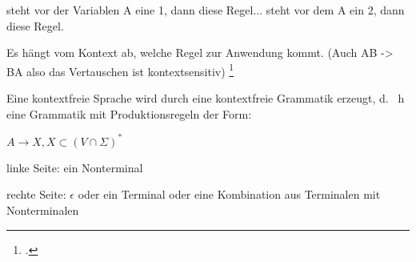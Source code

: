 \documentclass{lehramt-informatik-haupt}
\begin{document}
steht vor der Variablen A eine 1, dann
diese Regel...
steht vor dem A ein 2, dann diese Regel.

Es hängt vom Kontext ab, welche Regel zur Anwendung kommt.
(Auch AB -> BA also das Vertauschen ist kontextsensitiv)
\footcite[Seite 9]{theo:fs:2}

Eine kontextfreie Sprache wird durch eine kontextfreie Grammatik
erzeugt, d. \, h eine Grammatik mit Produktionsregeln der Form:

$A \rightarrow X, X \subset (V \cap \Sigma)^*$

linke Seite: ein Nonterminal

rechte Seite: $\epsilon$ oder ein Terminal oder eine
Kombination aus Terminalen mit
Nonterminalen

\literatur
\end{document}
